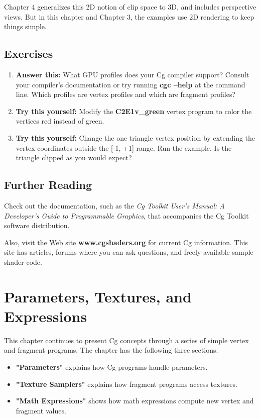 \documentclass{book}
\begin{document}
Chapter 4 generalizes this 2D notion of clip space to 3D, and includes perspective views. But in this chapter and Chapter 3, the examples use 2D rendering to keep things simple.

\section{Exercises}

\FloatBarrier
\begin{enumerate}
\item \textbf{Answer this:} What GPU profiles does your Cg compiler support? Consult your compiler's documentation or try running \textbf{cgc –help} at the command line. Which profiles are vertex profiles and which are fragment profiles?
\item \textbf{Try this yourself:} Modify the \textbf{C2E1v_green} vertex program to color the vertices red instead of green.
\item \textbf{Try this yourself:} Change the one triangle vertex position by extending the vertex coordinates outside the [-1, +1] range. Run the example. Is the triangle clipped as you would expect?
\end{enumerate}
\FloatBarrier

\section{Further Reading}

Check out the documentation, such as the \textit{Cg Toolkit User's Manual: A Developer's Guide to Programmable Graphics}, that accompanies the Cg Toolkit software distribution.

Also, visit the Web site \textbf{www.cgshaders.org} for current Cg information. This site has articles, forums where you can ask questions, and freely available sample shader code.

\chapter{Parameters, Textures, and Expressions}

This chapter continues to present Cg concepts through a series of simple vertex and fragment programs. The chapter has the following three sections:

\FloatBarrier
\begin{itemize}
\item \textbf{"Parameters"} explains how Cg programs handle parameters.
\item \textbf{"Texture Samplers"} explains how fragment programs access textures.
\item \textbf{"Math Expressions"} shows how math expressions compute new vertex and fragment values.
\end{itemize}
\end{document}
